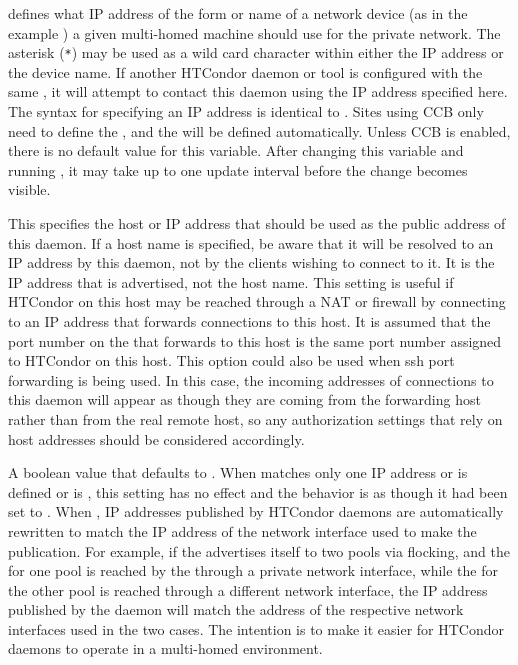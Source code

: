 \begin{description}
   defines what IP address
  of the form  or name
  of a network device (as in the example )
  a given multi-homed machine should use for the private network.
  The asterisk (\verb|*|) may be used as a wild card character within either
  the IP address or the device name.
  If another HTCondor daemon or tool is configured with the same
  , it will attempt to contact this
  daemon using the IP address specified here.
  The syntax for specifying an IP address is identical to 
  .
  Sites using CCB only need to define
  the ,
  and the  will be defined automatically.
  Unless CCB is enabled, there is no default value for this variable.
  After changing this variable and running , 
  it may take up to one  update interval 
  before the change becomes visible.

\label{param:TcpForwardingHost}
\item[\Macro{TCP\_FORWARDING\_HOST}]
  This specifies the host or IP address that should be used as the
  public address of this daemon.  If a host name is specified, be aware
  that it will be resolved to an IP address by this daemon, not by the clients
  wishing to connect to it.  It is the IP address that is advertised, not
  the host name.  This setting is useful if HTCondor on this
  host may be reached through a NAT or firewall by connecting to an
  IP address that forwards connections to this host.  It
  is assumed that the port number on the 
  that forwards to this host is the same port number assigned to
  HTCondor on this host.  This option could also be used when ssh port
  forwarding is being used.  In this case, the incoming addresses
  of connections to this daemon will appear as though they are coming
  from the forwarding host rather than from the real remote host, so any
  authorization settings that rely on host addresses should be
  considered accordingly.

\label{param:EnableAddressRewriting}
\item[\Macro{ENABLE\_ADDRESS\_REWRITING}]
  A boolean value that defaults to .  When
   matches only one IP address or
   is defined or
   is , this setting has no effect and
  the behavior is as though it had been set to .  When ,
  IP addresses published by HTCondor daemons are automatically rewritten to
  match the IP address of the network interface used to make the
  publication.  For example, if the  advertises itself to
  two pools via flocking, and the  for one pool is reached
  by the  through a private network interface, while
  the  for the other pool is reached through a different
  network interface, the IP address published by the 
  daemon will match the address of the respective network interfaces
  used in the two cases.  The intention is to make it easier for
  HTCondor daemons to operate in a multi-homed environment.


\end{description}
